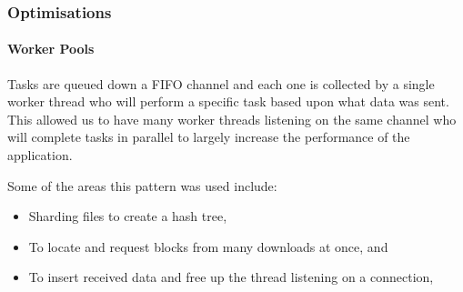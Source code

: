 
\subsubsection*{Optimisations}

\paragraph*{Worker Pools}
Tasks are queued down a FIFO channel and each one is collected by a single worker thread who will perform a specific task based upon what data was sent. This allowed us to have many worker threads listening on the same channel who will complete tasks in parallel to largely increase the performance of the application.

\vspace{2mm}\noindent
Some of the areas this pattern was used include:

\begin{itemize}
  \item Sharding files to create a hash tree,
  \item To locate and request blocks from many downloads at once, and
  \item To insert received data and free up the thread listening on a connection,
\end{itemize}
